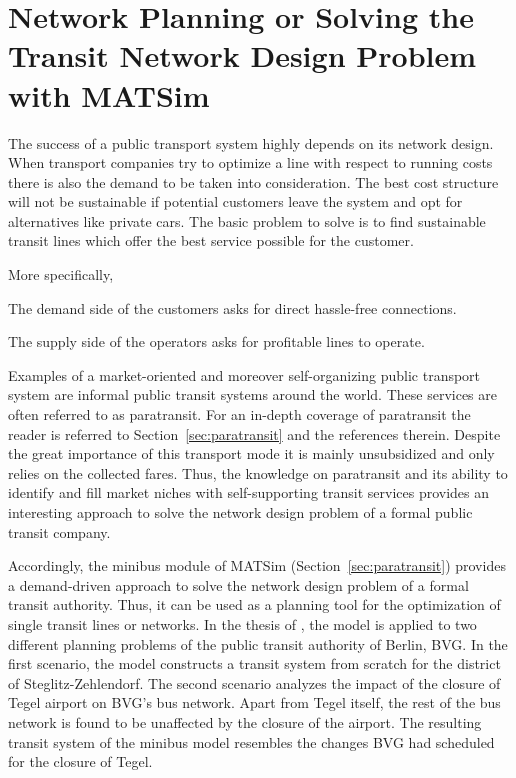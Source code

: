 \section{Network Planning or Solving the Transit Network Design Problem with MATSim}
\label{sec:paratransit_application}
%
The success of a public transport system highly depends on its network design. When transport companies try to optimize a line with respect to running costs there is also the demand to be taken into consideration. The best cost structure will not be sustainable if potential customers leave the system and opt for alternatives like private cars. The basic problem to solve is to find sustainable transit lines which offer the best service possible for the customer.

More specifically,
\begin{compactitem}
\item The demand side of the customers asks for direct hassle-free connections.
\item The supply side of the operators asks for profitable lines to operate.
\end{compactitem}
Examples of a market-oriented and moreover self-organizing public transport system are informal public transit systems around the world. These services are often referred to as paratransit. For an in-depth coverage of paratransit the reader is referred to Section~\ref{sec:paratransit} and the references therein. Despite the great importance of this transport mode it is mainly unsubsidized and only relies on the collected fares. Thus, the knowledge on paratransit and its ability to identify and fill market niches with self-supporting transit services provides an interesting approach to solve the network design problem of a formal public transit company.

\noindent
Accordingly, the minibus module of MATSim (Section~\ref{sec:paratransit}) provides a demand-driven approach to solve the network design problem of a formal transit authority. Thus, it can be used as a planning tool for the optimization of single transit lines or networks. In the thesis of \citet[][]{Neumann_PhDThesis_2014}, the model is applied to two different planning problems of the public transit authority of Berlin, BVG. In the first scenario, the model constructs a transit system from scratch for the district of Steglitz-Zehlendorf. The second scenario analyzes the impact of the closure of Tegel airport on BVG's bus network. Apart from Tegel itself, the rest of the bus network is found to be unaffected by the closure of the airport. The resulting transit system of the minibus model resembles the changes BVG had scheduled for the closure of Tegel.


